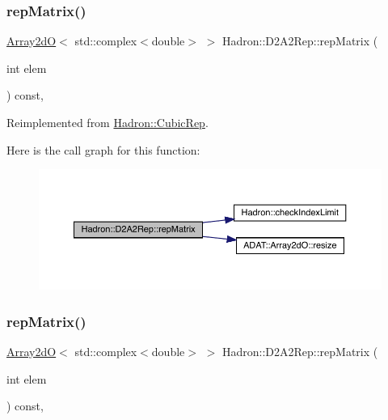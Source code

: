 \subsubsection{\texorpdfstring{repMatrix()}{repMatrix()}\hspace{0.1cm}{\footnotesize\ttfamily [1/2]}}
{\footnotesize\ttfamily \mbox{\hyperlink{classADAT_1_1Array2dO}{Array2dO}}$<$ std\+::complex$<$double$>$ $>$ Hadron\+::\+D2\+A2\+Rep\+::rep\+Matrix (\begin{DoxyParamCaption}\item[{int}]{elem }\end{DoxyParamCaption}) const\hspace{0.3cm}{\ttfamily [inline]}, {\ttfamily [virtual]}}



Reimplemented from \mbox{\hyperlink{structHadron_1_1CubicRep_ac5d7e9e6f4ab1158b5fce3e4ad9e8005}{Hadron\+::\+Cubic\+Rep}}.

Here is the call graph for this function\+:
\nopagebreak
\begin{figure}[H]
\begin{center}
\leavevmode
\includegraphics[width=350pt]{d2/dfc/structHadron_1_1D2A2Rep_a75e7a00548888c39a9e3613c4b5178ef_cgraph}
\end{center}
\end{figure}
\mbox{\label{structHadron_1_1D2A2Rep_a75e7a00548888c39a9e3613c4b5178ef}} 
\subsubsection{\texorpdfstring{repMatrix()}{repMatrix()}\hspace{0.1cm}{\footnotesize\ttfamily [2/2]}}
{\footnotesize\ttfamily \mbox{\hyperlink{classADAT_1_1Array2dO}{Array2dO}}$<$ std\+::complex$<$double$>$ $>$ Hadron\+::\+D2\+A2\+Rep\+::rep\+Matrix (\begin{DoxyParamCaption}\item[{int}]{elem }\end{DoxyParamCaption}) const\hspace{0.3cm}{\ttfamily [inline]}, {\ttfamily [virtual]}}



